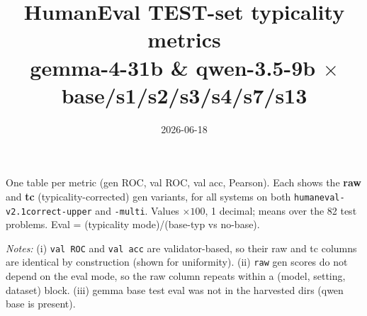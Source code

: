 \documentclass[10pt]{article}
\title{HumanEval TEST-set typicality metrics\\ \large gemma-4-31b \& qwen-3.5-9b $\times$ base/s1/s2/s3/s4/s7/s13}
\author{}
\date{2026-06-18}
\begin{document}
\maketitle

One table per metric (gen ROC, val ROC, val acc, Pearson). Each shows the \textbf{raw} and
\textbf{tc} (typicality-corrected) gen variants, for all systems on both
\texttt{humaneval-v2.1correct-upper} and \texttt{-multi}. Values $\times 100$, 1 decimal;
means over the 82 test problems. Eval = (typicality mode)/(base-typ vs no-base).

\medskip\noindent\textit{Notes:} (i) \texttt{val ROC} and \texttt{val acc} are validator-based, so
their raw and tc columns are identical by construction (shown for uniformity). (ii) \texttt{raw}
gen scores do not depend on the eval mode, so the raw column repeats within a (model, setting,
dataset) block. (iii) gemma base test eval was not in the harvested dirs (qwen base is present).





\end{document}
